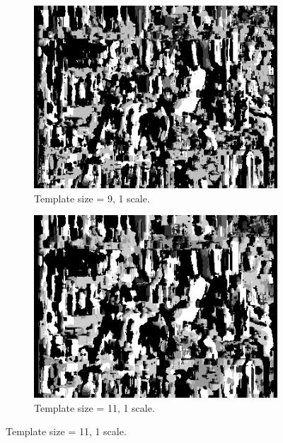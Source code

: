 \documentclass[12pt,a4paper,oneside,final]{article}
\begin{document}
\begin{figure}[H]
		\begin{subfigure}[b]{0.24\textwidth}
			\includegraphics[width=\textwidth]{disparity_s1_k9set_1.png}
			\caption{Template size = 9, 1 scale.}
		\end{subfigure}
		\begin{subfigure}[b]{0.24\textwidth}
			\includegraphics[width=\textwidth]{disparity_s1_k11set_1.png}
			\caption{Template size = 11, 1 scale.}
		\end{subfigure}
	\end{figure}
\end{document}
